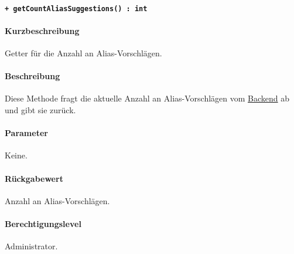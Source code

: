 \paragraph{\texttt{+ getCountAliasSuggestions() : int}}\label{AP_Framework_getCountAliasSuggestions}%
\paragraph*{Kurzbeschreibung}
Getter für die Anzahl an Alias-Vorschlägen.
\paragraph*{Beschreibung}
Diese Methode fragt die aktuelle Anzahl an Alias-Vorschlägen vom \hyperref[AP_Backend]{Backend} ab und gibt sie zurück.
\paragraph*{Parameter}
Keine.
\paragraph*{Rückgabewert}
Anzahl an Alias-Vorschlägen.
\paragraph*{Berechtigungslevel}
Administrator.